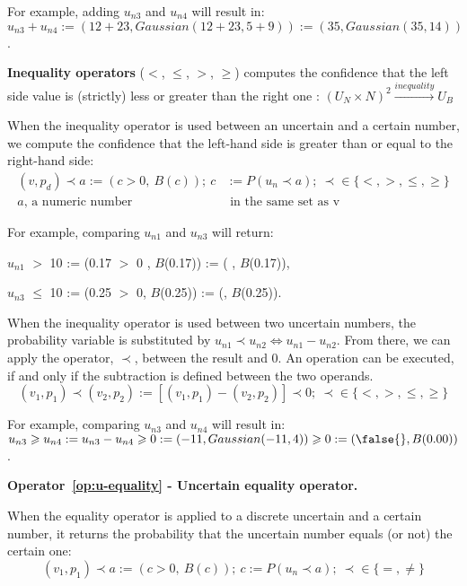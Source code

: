For example, adding $u_{n3}$ and $u_{n4}$ will result in: $u_{n3} + u_{n4} := (12+23, Gaussian(12+23, 5+9)) := (35, Gaussian(35, 14))$.

\bigskip

\begin{operator}
	\label{op:inequality}
	\textbf{Inequality operators} ($<$, $\leqslant$, $>$, $\geqslant$) computes the confidence that the left side value is (strictly) less or greater than the right one : $(U_N \times N)^2 \xrightarrow{inequality} U_B$
\end{operator}

When the inequality operator is used between an uncertain and a certain number, we compute the confidence that the left-hand side is greater than or equal to the right-hand side:
\begin{align*}
	(v, p_d) \prec a := (c > 0 ,~B(c));~c &:= P(u_n \prec a);~\prec \in \{<,>,\leqslant, \geqslant\}\\
	a \text{, a numeric number}& \text{ in the same set as v}
\end{align*}

For example, comparing $u_{n1}$ and $u_{n3}$ will return:
\begin{itemize*}
	\item[] $u_{n1}$ $>$ 10 := (0.17 $>$ 0 , $B$(0.17)) := (\true{} , $B$(0.17)),
	\item[] $u_{n3}$ $\leqslant$ 10 := (0.25 $>$ 0, $B$(0.25)) := (\true{}, $B$(0.25)).
\end{itemize*}

When the inequality operator is used between two uncertain numbers, the probability variable is substituted by $ u_{n1} \prec u_{n2} \Leftrightarrow u_{n1} - u_{n2}$. 
From there, we can apply the operator, $\prec$, between the result and 0.
An operation can be executed, if and only if the subtraction is defined between the two operands.
$$(v_1, p_1) \prec (v_2, p_2) := [(v_1, p_1) - (v_2, p_2)] \prec 0;~\prec \in \{<,>,\leqslant, \geqslant\}$$

For example, comparing $u_{n3}$ and $u_{n4}$ will result in: $u_{n3} \geqslant u_{n4} := u_{n3} - u_{n4} \geqslant 0 := (-11, Gaussian(-11, 4)) \geqslant 0 := (\false{}, B(0.00))$.

\bigskip

\noindent\textbf{Operator~\ref{op:u-equality} - Uncertain equality operator.~}

When the equality operator is applied to a discrete uncertain and a certain number, it returns the probability that the uncertain number equals (or not) the certain one:
$$(v_1, p_1) \prec a := (c > 0 ,~B(c));~c := P(u_n \prec a);~\prec \in \{=, \ne\}$$

